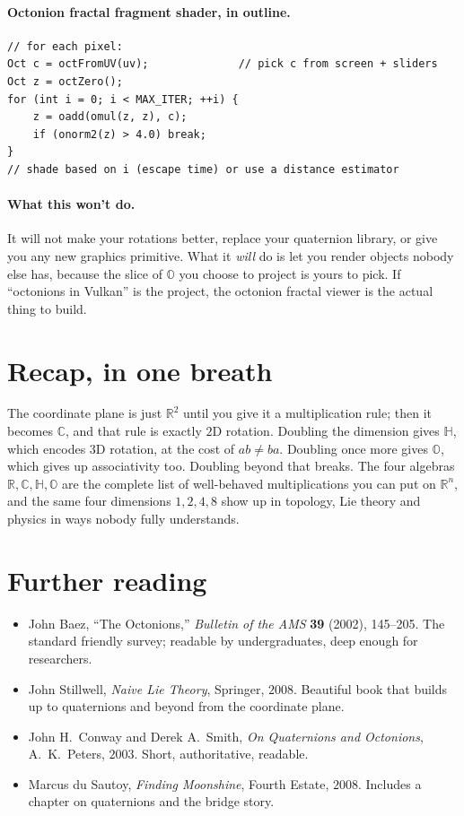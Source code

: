 \documentclass[11pt]{article}
\newcommand{\R}{\mathbb{R}}
\newcommand{\C}{\mathbb{C}}
\newcommand{\HH}{\mathbb{H}}
\newcommand{\OO}{\mathbb{O}}
\begin{document}
\paragraph{Octonion fractal fragment shader, in outline.}
\begin{verbatim}
// for each pixel:
Oct c = octFromUV(uv);              // pick c from screen + sliders
Oct z = octZero();
for (int i = 0; i < MAX_ITER; ++i) {
    z = oadd(omul(z, z), c);
    if (onorm2(z) > 4.0) break;
}
// shade based on i (escape time) or use a distance estimator
\end{verbatim}

\paragraph{What this won't do.} It will not make your rotations
better, replace your quaternion library, or give you any new graphics
primitive. What it \emph{will} do is let you render objects nobody
else has, because the slice of $\OO$ you choose to project is yours
to pick. If ``octonions in Vulkan'' is the project, the octonion
fractal viewer is the actual thing to build.

\section*{Recap, in one breath}

The coordinate plane is just $\R^2$ until you give it a multiplication
rule; then it becomes $\C$, and that rule is exactly $2$D rotation.
Doubling the dimension gives $\HH$, which encodes $3$D rotation, at
the cost of $ab \neq ba$. Doubling once more gives $\OO$, which
gives up associativity too. Doubling beyond that breaks. The four
algebras $\R, \C, \HH, \OO$ are the complete list of well-behaved
multiplications you can put on $\R^n$, and the same four dimensions
$1, 2, 4, 8$ show up in topology, Lie theory and physics in ways
nobody fully understands.

\section*{Further reading}

\begin{itemize}[leftmargin=*, itemsep=2pt]
  \item John Baez, ``The Octonions,'' \emph{Bulletin of the AMS}
        \textbf{39} (2002), 145--205. The standard friendly
        survey; readable by undergraduates, deep enough for
        researchers.
  \item John Stillwell, \emph{Naive Lie Theory}, Springer, $2008$.
        Beautiful book that builds up to quaternions and beyond from
        the coordinate plane.
  \item John H.\ Conway and Derek A.\ Smith, \emph{On Quaternions
        and Octonions}, A.\ K.\ Peters, $2003$. Short, authoritative,
        readable.
  \item Marcus du Sautoy, \emph{Finding Moonshine}, Fourth Estate,
        $2008$. Includes a chapter on quaternions and the bridge
        story.
\end{itemize}
\end{document}
